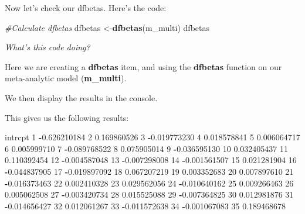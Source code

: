 \documentclass[
]{book}
\newenvironment{Shaded}{\begin{snugshade}}{\end{snugshade}}
\newcommand{\CommentTok}[1]{\textcolor[rgb]{0.56,0.35,0.01}{\textit{#1}}}
\newcommand{\DecValTok}[1]{\textcolor[rgb]{0.00,0.00,0.81}{#1}}
\newcommand{\FloatTok}[1]{\textcolor[rgb]{0.00,0.00,0.81}{#1}}
\newcommand{\FunctionTok}[1]{\textcolor[rgb]{0.13,0.29,0.53}{\textbf{#1}}}
\newcommand{\NormalTok}[1]{#1}
\newcommand{\OtherTok}[1]{\textcolor[rgb]{0.56,0.35,0.01}{#1}}
\newcommand{\SpecialCharTok}[1]{\textcolor[rgb]{0.81,0.36,0.00}{\textbf{#1}}}
\begin{document}
Now let's check our dfbetas. Here's the code:

\begin{Shaded}
\begin{Highlighting}[]
\CommentTok{\#Calculate dfbetas}
\NormalTok{dfbetas }\OtherTok{\textless{}{-}}\FunctionTok{dfbetas}\NormalTok{(m\_multi)}
\NormalTok{dfbetas }
\end{Highlighting}
\end{Shaded}

\emph{What's this code doing?}

Here we are creating a \textbf{dfbetas} item, and using the \textbf{dfbetas} function on our meta-analytic model (\textbf{m\_multi}).

We then display the results in the console.

This gives us the following results:

\begin{Shaded}
\begin{Highlighting}[]
\NormalTok{        intrcpt}
\DecValTok{1}  \SpecialCharTok{{-}}\FloatTok{0.626210184}
\DecValTok{2}   \FloatTok{0.169860526}
\DecValTok{3}  \SpecialCharTok{{-}}\FloatTok{0.019773230}
\DecValTok{4}   \FloatTok{0.018578841}
\DecValTok{5}   \FloatTok{0.006064717}
\DecValTok{6}   \FloatTok{0.005999710}
\DecValTok{7}  \SpecialCharTok{{-}}\FloatTok{0.089768522}
\DecValTok{8}   \FloatTok{0.075905014}
\DecValTok{9}  \SpecialCharTok{{-}}\FloatTok{0.036595130}
\DecValTok{10}  \FloatTok{0.032405437}
\DecValTok{11}  \FloatTok{0.110392454}
\DecValTok{12} \SpecialCharTok{{-}}\FloatTok{0.004587048}
\DecValTok{13} \SpecialCharTok{{-}}\FloatTok{0.007298008}
\DecValTok{14} \SpecialCharTok{{-}}\FloatTok{0.001561507}
\DecValTok{15}  \FloatTok{0.021281904}
\DecValTok{16} \SpecialCharTok{{-}}\FloatTok{0.044837905}
\DecValTok{17} \SpecialCharTok{{-}}\FloatTok{0.019897092}
\DecValTok{18}  \FloatTok{0.067207219}
\DecValTok{19}  \FloatTok{0.003352683}
\DecValTok{20}  \FloatTok{0.007897610}
\DecValTok{21} \SpecialCharTok{{-}}\FloatTok{0.016373463}
\DecValTok{22}  \FloatTok{0.002410328}
\DecValTok{23}  \FloatTok{0.029562056}
\DecValTok{24} \SpecialCharTok{{-}}\FloatTok{0.010640162}
\DecValTok{25}  \FloatTok{0.009266463}
\DecValTok{26}  \FloatTok{0.005062508}
\DecValTok{27} \SpecialCharTok{{-}}\FloatTok{0.003420734}
\DecValTok{28}  \FloatTok{0.015525088}
\DecValTok{29} \SpecialCharTok{{-}}\FloatTok{0.007364825}
\DecValTok{30}  \FloatTok{0.012981876}
\DecValTok{31} \SpecialCharTok{{-}}\FloatTok{0.014656427}
\DecValTok{32}  \FloatTok{0.012061267}
\DecValTok{33} \SpecialCharTok{{-}}\FloatTok{0.011572638}
\DecValTok{34} \SpecialCharTok{{-}}\FloatTok{0.001067083}
\DecValTok{35}  \FloatTok{0.189468678}
\end{Highlighting}
\end{Shaded}
\end{document}
